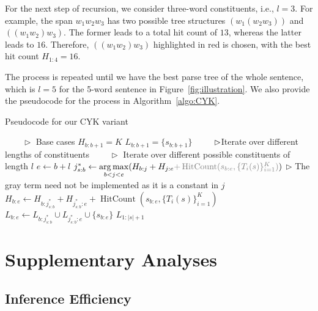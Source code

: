 \documentclass{article}
\DeclareMathOperator*{\argmax}{arg\,max}
\begin{document}
For the next step of recursion, we consider three-word constituents, i.e., $l=3$. For example, the span $w_1 w_2 w_3$ has two possible tree structures $(w_1(w_2w_3))$ and $((w_1w_2)w_3)$. The former leads to a total hit count of $13$, whereas the latter leads to $16$. Therefore, $((w_1w_2)w_3)$ highlighted in red is chosen, with the best hit count $H_{1:4}=16$.

The process is repeated until we have the best parse tree of the whole sentence, which is $l=5$ for the 5-word sentence in Figure~\ref{fig:illustration}. We also provide the pseudocode for the process in Algorithm~\ref{algo:CYK}.

\begin{algorithm}[!t]
\caption{Pseudocode for our CYK variant}
\label{algo:CYK}
\begin{algorithmic}[1]
     $\qquad \rhd$ Base cases
        \State $H_{b:b+1} = K$
        \State $L_{b:b+1}=\{s_{b:b+1}\}$
    \EndFor
     $\qquad\hspace{0.06cm}\rhd$Iterate over different lengths of constituents
         $\qquad \rhd$ Iterate over different possible constituents of length $l$
            \State $e \gets b+l$
            \State $j^*_{s:b} \gets \argmax\limits_{b < j < e} ( H_{b:j}+H_{j:e} {\color{gray}  + \operatorname{HitCount}(s_{b:e}, \{T_i(s)\}_{i=1}^K)})$
        \Statex \hspace{4cm}$\rhd$ The {\color{gray}gray} term need not be implemented as it is a constant in $j$
            \State $H_{b:e} \gets H_{b:j^*_{s:b}} + H_{j^*_{s:b}:e} + \operatorname{HitCount}(s_{b:e}, \{T_i(s)\}_{i=1}^K)$
            \State $L_{b:e} \gets L_{b:j^*_{s:b}} \cup L_{j^*_{s:b}:e} \cup \{s_{b:e}\}$
        \EndFor
    \EndFor
    \State \Return $L_{1:|s|+1}$
\EndFunction
\end{algorithmic}
\end{algorithm}

\section{Supplementary Analyses}
\label{app:additional}

\subsection{Inference Efficiency}\label{app:efficiency}
\end{document}
